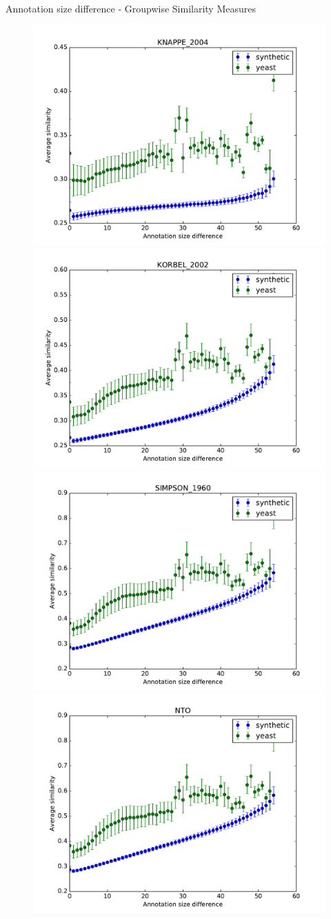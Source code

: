 \documentclass{beamer}
\begin{document}
\begin{frame}{Annotation size difference - Groupwise Similarity Measures}
\begin{figure}
\includegraphics[width=0.5\linewidth, height=0.4\textheight]{groupwise_diff/SIM_FRAMEWORK_DAG_SET_KNAPPE_2004_diff.pdf}
\includegraphics[width=0.5\linewidth, height=0.4\textheight]{groupwise_diff/SIM_FRAMEWORK_DAG_SET_KORBEL_2002_diff.pdf} \\
\includegraphics[width=0.5\linewidth, height=0.4\textheight]{groupwise_diff/SIM_FRAMEWORK_DAG_SET_SIMPSON_1960_diff.pdf}
\includegraphics[width=0.5\linewidth, height=0.4\textheight]{groupwise_diff/SIM_GROUPWISE_DAG_NTO_diff.pdf}
\end{figure}
\end{frame}
\end{document}
